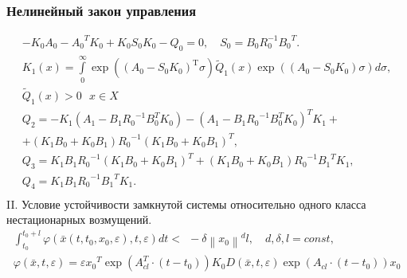 \documentclass[default]{beamer}
\begin{document}
	\begin{frame}
		\frametitle{Нелинейный закон управления}
		\begingroup
		\fontsize{9pt}{9pt}\selectfont
			\[\begin{matrix}
			-{{K}_{0}}{{A}_{0}}-{{A}_{0}}^{T}{{K}_{0}}+{{K}_{0}}{{S}_{0}}{{K}_{0}}-{{Q}_{0}}=0,\quad {{S}_{0}}={{B}_{0}}R_{0}^{-1}{{B}_{0}}^{T}.\\
			{{K}_{1}}(x)=\int\limits_{0}^{\infty }{\exp (({{A}_{0}}-{{S}_{0}}{{K}_{0}})_{{}}^{\text{T}}\sigma )}{{{\tilde{Q}}}_{1}}(x)\exp (({{A}_{0}}-{{S}_{0}}{{K}_{0}})\sigma )d\sigma ,\\ {{{\tilde{Q}}}_{1}}(x)>0\text{  }x\in X \\ 
			
			{{Q}_{2}}=-{{K}_{1}}\left( {{A}_{1}}-{{B}_{1}}{{R}_{0}}^{-1}B_{0}^{T}{{K}_{0}} \right)-{{\left( {{A}_{1}}-{{B}_{1}}{{R}_{0}}^{-1}B_{0}^{T}{{K}_{0}} \right)}^{T}}{{K}_{1}}+\\
			
			+\left( {{K}_{1}}{{B}_{0}}+{{K}_{0}}{{B}_{1}} \right){{R}_{0}}^{-1}{{\left( {{K}_{1}}{{B}_{0}}+{{K}_{0}}{{B}_{1}} \right)}^{T}}, \\ 
			
			{{Q}_{3}}={{K}_{1}}{{B}_{1}}{{R}_{0}}^{-1}{{\left( {{K}_{1}}{{B}_{0}}+{{K}_{0}}{{B}_{1}} \right)}^{T}}+\left( {{K}_{1}}{{B}_{0}}+{{K}_{0}}{{B}_{1}} \right){{R}_{0}}^{-1}{{B}_{1}}^{T}{{K}_{1}}, \\ 
			{{Q}_{4}}={{K}_{1}}{{B}_{1}}{{R}_{0}}^{-1}{{B}_{1}}^{T}{{K}_{1}}. \\ 
			\end{matrix}\]
		\endgroup
		II. Условие устойчивости замкнутой системы относительно одного класса нестационарных возмущений. 
		\begingroup
		\fontsize{9pt}{9pt}\selectfont
			\[\begin{matrix}
			\int_{{{t}_{0}}}^{{{t}_{0}}+l}{\varphi (\bar{x}(t,{{t}_{0}},{{x}_{0}},\varepsilon ),t,\varepsilon )}dt<\ \ -\delta {{\left\| {{x}_{0}} \right\|}^{d}}l,\quad d,\delta ,l=const, \\ 
			\varphi (\bar{x},t,\varepsilon )=\varepsilon {{x}_{0}}^{T}\exp (A_{cl}^{T}\cdot (t-{{t}_{0}})){{K}_{0}}D(\bar{x},t,\varepsilon )\exp ({{A}_{cl}}\cdot (t-{{t}_{0}})){{x}_{0}} \\ 
			\end{matrix}\]
		\endgroup
	\end{frame}
	
\end{document}
